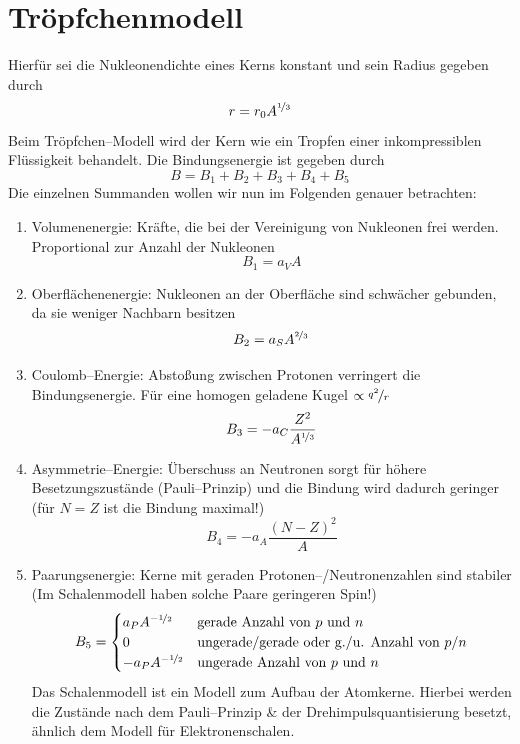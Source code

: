 \documentclass[Ex4_Zusammenfassung.tex]{subfiles}
\begin{document}
\section{Tröpfchenmodell}
Hierfür sei die Nukleonendichte eines Kerns konstant und sein Radius gegeben durch
\begin{equation}
	r = r_0 A^{\nicefrac{1}{3}}
\end{equation}
Beim Tröpfchen--Modell wird der Kern wie ein Tropfen einer inkompressiblen Flüssigkeit behandelt. Die Bindungsenergie ist gegeben durch
\begin{equation}
	B = B_1 + B_2 + B_3 + B_4 + B_5
\end{equation}
Die einzelnen Summanden wollen wir nun im Folgenden genauer betrachten:
\begin{enumerate}
	\item Volumenenergie: Kräfte, die bei der Vereinigung von Nukleonen frei werden. Proportional zur Anzahl der Nukleonen
		\begin{equation}
			B_1 = a_V A
		\end{equation}
	
	\item Oberflächenenergie: Nukleonen an der Oberfläche sind schwächer gebunden, da sie weniger Nachbarn besitzen
		\begin{equation}
			B_2 = a_S A^{\nicefrac{2}{3}}
		\end{equation}
	
	\item Coulomb--Energie: Abstoßung zwischen Protonen verringert die Bindungsenergie. Für eine homogen geladene Kugel $\propto \nicefrac{q^2}{r}$
		\begin{equation}
			B_3 = - a_C \frac{Z^2}{A^{\nicefrac{1}{3}}}
		\end{equation}
		
	\item Asymmetrie--Energie: Überschuss an Neutronen sorgt für höhere Besetzungszustände (Pauli--Prinzip) und die Bindung wird dadurch geringer (für $N=Z$ ist die Bindung maximal!)
		\begin{equation}
			B_4 = - a_A \frac{(N-Z)^2}{A}
		\end{equation}
		
	\item Paarungsenergie: Kerne mit geraden Protonen--/Neutronenzahlen sind stabiler (Im Schalenmodell haben solche Paare geringeren Spin!) 
		\begin{equation}
			B_5 = 
				\begin{cases}
					a_P A^{-\nicefrac{1}{2}} & \text{gerade Anzahl von $p$ und $n$}\\
					0 									   & \text{ungerade/gerade oder g./u. Anzahl von $p$/$n$}\\
					- a_P A^{-\nicefrac{1}{2}} & \text{ungerade Anzahl von $p$ und $n$}
				\end{cases}
		\end{equation}
	Das Schalenmodell ist ein Modell zum Aufbau der Atomkerne. Hierbei werden die Zustände nach dem Pauli--Prinzip \& der Drehimpulsquantisierung besetzt, ähnlich dem Modell für Elektronenschalen.
	 

\end{enumerate}
\end{document}
